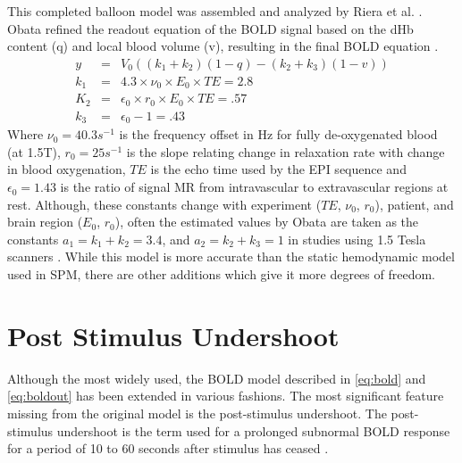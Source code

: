 This completed balloon model was assembled and analyzed
by Riera et al. \cite{Riera2003}. Obata refined the readout equation 
of the \ac{BOLD} signal based on the
\ac{dHb} content (q) and local blood volume (v), resulting in the
final \ac{BOLD} equation \cite{Obata2004}.
\begin{eqnarray}
y   &=& V_0((k_1 + k_2)(1-q) - (k_2 + k_3)(1-v))\\
k_1 &=& 4.3 \times \nu_0 \times E_0 \times TE = 2.8\\
K_2 &=& \epsilon_0 \times r_0 \times E_0 \times TE = .57\\
k_3 &=& \epsilon_0 - 1 = .43
\label{eq:boldout}
\end{eqnarray}
Where $\nu_0 = 40.3 s^{-1}$  is the frequency offset in Hz for fully
de-oxygenated blood (at 1.5T), $r_0 = 25 s^{-1}$  is the slope relating
change in relaxation rate with change in blood oxygenation, $TE$ is the
echo time used by the \ac{EPI} sequence and $\epsilon_0 = 1.43$ is the 
ratio of signal \ac{MR} from intravascular to extravascular regions at rest. Although,
these constants change with experiment ($TE$, $\nu_0$, $r_0$),
patient, and brain 
region ($E_0$, $r_0$), often the estimated values by Obata are 
taken as the constants $a_1 = k_1 + k_2 = 3.4$, and $a_2 = k_2+k_3 = 1$ in 
studies using 1.5 Tesla scanners \cite{Obata2004}.
While this model is more accurate than the static hemodynamic model used in \ac{SPM},
there are other additions which give it more degrees of freedom. 

\section{Post Stimulus Undershoot}
\label{sec:Post Stimulus Undershoot}
Although the most widely used, the \ac{BOLD} model described in \autoref{eq:bold}
and \autoref{eq:boldout} has been extended in various fashions. The most
significant feature missing from the original model is the 
post-stimulus undershoot.
The post-stimulus undershoot is the term used for a prolonged subnormal
\ac{BOLD} response for a period of 10 to 60 seconds after stimulus has
ceased \cite{Chen2009,Mandeville1999a}.

